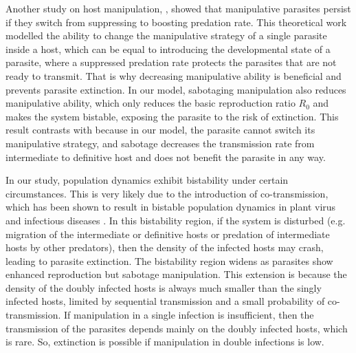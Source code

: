 \documentclass[a4paper]{scrartcl}
\begin{document}
Another study on host manipulation, \cite{Iritani2018}, showed that manipulative parasites persist if they switch from suppressing to boosting predation rate.
This theoretical work modelled the ability to change the manipulative strategy of a single parasite inside a host, which can be equal to introducing the developmental state of a parasite, where a suppressed predation rate protects the parasites that are not ready to transmit.
That is why decreasing manipulative ability is beneficial and prevents parasite extinction.
In our model, sabotaging manipulation also reduces manipulative ability, which only reduces the basic reproduction ratio $R_0$ and makes the system bistable, exposing the parasite to the risk of extinction. 
This result contrasts with \cite{Iritani2018} because in our model, the parasite cannot switch its manipulative strategy, and sabotage decreases the transmission rate from intermediate to definitive host and does not benefit the parasite in any way. 

In our study, population dynamics exhibit bistability under certain circumstances. 
This is very likely due to the introduction of co-transmission, which has been shown to result in bistable population dynamics in plant virus \cite{allen_modelling_2019} and infectious diseases \cite{gao_coinfection_2016-1}.
 In this bistability region, if the system is disturbed (e.g. migration of the intermediate or definitive hosts or predation of intermediate hosts by other predators), then the density of the infected hosts may crash, leading to parasite extinction. 
The bistability region widens as parasites show enhanced reproduction but sabotage manipulation. 
This extension is because the density of the doubly infected hosts is always much smaller than the singly infected hosts, limited by sequential transmission and a small probability of co-transmission. 
If manipulation in a single infection is insufficient, then the transmission of the parasites depends mainly on the doubly infected hosts, which is rare. 
So, extinction is possible if manipulation in double infections is low.
\end{document}
